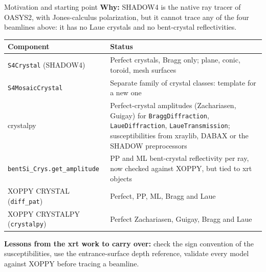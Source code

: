 \documentclass[aspectratio=169,10pt]{beamer}
\begin{document}
\begin{frame}{Motivation and starting point}
  \small
  \textbf{Why:} SHADOW4 is the native ray tracer of OASYS2, with Jones-calculus polarization,
  but it cannot trace any of the four beamlines above: it has no Laue crystals and no bent-crystal
  reflectivities.

  \vspace{0.5em}
  \begin{tabular}{@{}>{\raggedright\arraybackslash}p{}>{\raggedright\arraybackslash}p{}@{}}
    \toprule
    Component & Status \\
    \midrule
    \texttt{S4Crystal} (SHADOW4) & Perfect crystals, Bragg only; plane, conic, toroid, mesh surfaces \\
    \texttt{S4MosaicCrystal} & Separate family of crystal classes: template for a new one \\
    crystalpy & Perfect-crystal amplitudes (Zachariasen, Guigay) for \texttt{BraggDiffraction},
      \texttt{LaueDiffraction}, \texttt{LaueTransmission}; susceptibilities from xraylib,
      DABAX or the SHADOW preprocessors \\
    \texttt{bentSi\_Crys.get\_amplitude} & PP and ML bent-crystal reflectivity per ray, now
      checked against XOPPY, but tied to xrt objects \\
	  XOPPY CRYSTAL (\texttt{diff\_pat}) & Perfect, PP, ML, Bragg and Laue \\
	  XOPPY CRYSTALPY (\texttt{crystalpy}) & Perfect Zachariasen, Guigay, Bragg and Laue \\
    \bottomrule
  \end{tabular}

  \vspace{0.5em}
  \textbf{Lessons from the xrt work to carry over:} check the sign convention of the
  susceptibilities, use the entrance-surface depth reference, validate every model against XOPPY
  before tracing a beamline.
\end{frame}
\end{document}

